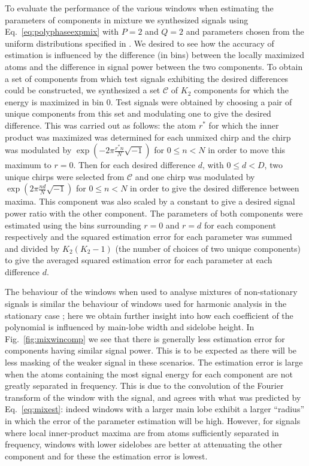 \documentclass[twoside,a4paper]{article}
\begin{document}
To evaluate the performance of the various windows when estimating the
parameters of components in mixture we synthesized signals using
Eq.~\ref{eq:polyphaseexpmix} with $P=2$ and $Q=2$ and parameters chosen from the
uniform distributions specified in \cite{betser2009sinusoidal}.  We desired to
see how the accuracy of estimation is influenced by the difference (in bins)
between the locally maximized atoms and the difference in signal power between
the two components. To obtain a set of components from which test signals
exhibiting the desired differences could be constructed, we synthesized a set
$\mathcal{C}$ of $K_{2}$ components for which the energy is maximized in bin 0.
Test signals were obtained by choosing a pair of unique components from this set
and modulating one to give the desired difference.  This was carried out as
follows: the atom $r^{\ast}$ for which the inner product was maximized was
determined for each unmixed chirp and the chirp was modulated by $\exp(-2\pi
\frac{r^{\ast} n}{N}\sqrt{-1})$ for $0 \leq n < N$ in order to move this maximum
to $r=0$. Then for each desired difference $d$, with $0 \leq d < D$, two unique
chirps were selected from $\mathcal{C}$ and one chirp was modulated by
$\exp(2\pi \frac{n d}{N}\sqrt{-1})$ for $0 \leq n < N$ in order to give the
desired difference between maxima. This component was also scaled by a constant
to give a desired signal power ratio with the other component. The parameters of
both components were estimated using the bins surrounding $r=0$ and $r=d$ for
each component respectively and the squared estimation error for each parameter
was summed and divided by $K_{2}(K_{2}-1)$ (the number of choices of two unique
components) to give the averaged squared estimation error for each parameter at
each difference $d$.

The behaviour of the windows when used to analyse mixtures of non-stationary
signals is similar the behaviour of windows used for harmonic analysis in the
stationary case \cite{harris1978use}; here we obtain further insight into how
each coefficient of the polynomial is influenced by main-lobe width and sidelobe
height. In Fig.~\ref{fig:mixwincomp} we see that there is generally less
estimation error for components having similar signal power. This is to be
expected as there will be less masking of the weaker signal in these scenarios.
The estimation error is large when the atoms containing the most signal energy
for each component are not greatly separated in frequency.  This is due to the
convolution of the Fourier transform of the window with the signal, and agrees
with what was predicted by Eq.~\ref{eq:mixest}: indeed windows with a larger
main lobe exhibit a larger ``radius'' in which the error of the parameter
estimation will be high.  However, for signals where local inner-product maxima
are from atoms sufficiently separated in frequency, windows with lower sidelobes
are better at attenuating the other component and for these the estimation error
is lowest.
\end{document}
